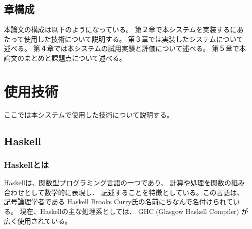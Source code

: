 \documentclass{cssspaper}
\begin{document}
        \section{章構成}
        本論文の構成は以下のようになっている。
        第２章で本システムを実装するにあたって使用した技術について説明する。
        第３章では実装したシステムについて述べる。
        第４章では本システムの試用実験と評価について述べる。
        第５章で本論文のまとめと課題点について述べる。

    \chapter{使用技術}
    ここでは本システムで使用した技術について説明する。

        \section{Haskell}

            \subsection{Haskellとは}
            Haskellは、関数型プログラミング言語の一つであり、
            計算や処理を関数の組み合わせとして数学的に表現し、
            記述することを特徴としている。この言語は、記号論理学者である
            Haskell Brooks Curry氏の名前にちなんで名付けられている。
            現在、Haskellの主な処理系としては、
            GHC (Glasgow Haskell Compiler) が広く使用されている。
      
\end{document}
